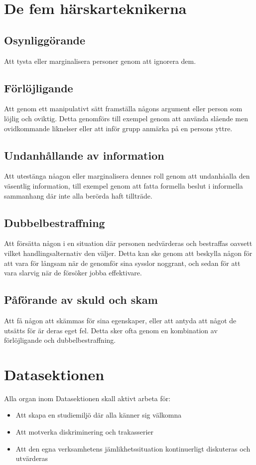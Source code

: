 \documentclass{dgovdoc}
\begin{document}
\section{De fem härskarteknikerna}

\subsection{Osynliggörande}
Att tysta eller marginalisera personer genom att ignorera dem.

\subsection{Förlöjligande}
Att genom ett manipulativt sätt framställa någons argument eller person som löjlig och oviktig. Detta genomförs till exempel genom att använda slående men ovidkommande liknelser eller att inför grupp anmärka på en persons yttre.

\subsection{Undanhållande av information}
Att utestänga nåagon eller marginalisera dennes roll genom att undanhåalla den väsentlig information, till exempel genom att fatta formella beslut i informella sammanhang där inte alla berörda haft tillträde.

\subsection{Dubbelbestraffning}
Att försätta någon i en situation där personen nedvärderas och bestraffas oavsett vilket handlingsalternativ den väljer. Detta kan ske genom att beskylla någon för att vara för långsam när de genomför sina sysslor noggrant, och sedan för att vara slarvig när de försöker jobba effektivare.

\subsection{Påförande av skuld och skam}
Att få någon att skämmas för sina egenskaper, eller att antyda att något de utsätts för är deras eget fel. Detta sker ofta genom en kombination av förlöjligande och dubbelbestraffning.

\section{Datasektionen}
Alla organ inom Datasektionen skall aktivt arbeta för:

\begin{itemize}
\item Att skapa en studiemiljö där alla känner sig välkomna
\item Att motverka diskriminering och trakasserier
\item Att den egna verksamhetens jämlikhetssituation kontinuerligt diskuteras och utvärderas
\end{itemize}
\end{document}
